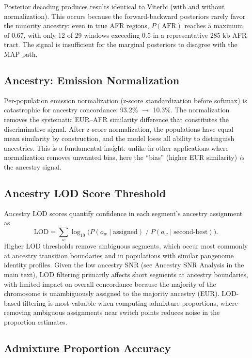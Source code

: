 \documentclass[11pt]{article}
\begin{document}
Posterior decoding produces results identical to Viterbi (with and without normalization). This occurs because the forward-backward posteriors rarely favor the minority ancestry: even in true AFR regions, $P(\text{AFR})$ reaches a maximum of 0.67, with only 12 of 29 windows exceeding 0.5 in a representative 285 kb AFR tract. The signal is insufficient for the marginal posteriors to disagree with the MAP path.

\subsection{Ancestry: Emission Normalization}
\label{sec:supp_normalization}

Per-population emission normalization (z-score standardization before softmax) is catastrophic for ancestry concordance: 93.2\% $\rightarrow$ 10.3\%. The normalization removes the systematic EUR--AFR similarity difference that constitutes the discriminative signal. After z-score normalization, the populations have equal mean similarity by construction, and the model loses all ability to distinguish ancestries. This is a fundamental insight: unlike in other applications where normalization removes unwanted bias, here the ``bias'' (higher EUR similarity) \emph{is} the ancestry signal.

\subsection{Ancestry LOD Score Threshold}

Ancestry LOD scores quantify confidence in each segment's ancestry assignment as
\[
\text{LOD} = \sum_w \log_{10}\!\bigl(P(o_w \mid \text{assigned}) \;/\; P(o_w \mid \text{second-best})\bigr).
\]
Higher LOD thresholds remove ambiguous segments, which occur most commonly at ancestry transition boundaries and in populations with similar pangenome identity profiles. Given the low ancestry SNR (see Ancestry SNR Analysis in the main text), LOD filtering primarily affects short segments at ancestry boundaries, with limited impact on overall concordance because the majority of the chromosome is unambiguously assigned to the majority ancestry (EUR). LOD-based filtering is most valuable when computing admixture proportions, where removing ambiguous assignments near switch points reduces noise in the proportion estimates.

\subsection{Admixture Proportion Accuracy}
\end{document}
